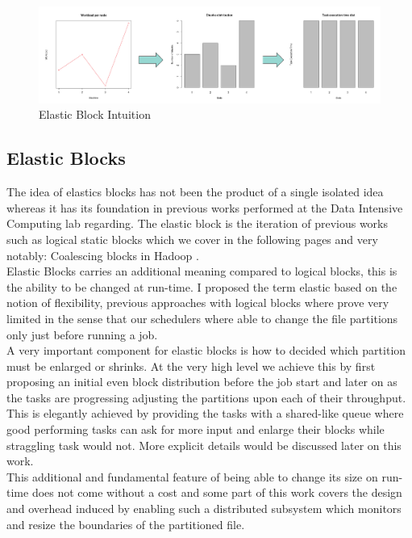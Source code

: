 \label{fig:vdfs_part}
\begin{figure}[H]
    \centering
    \includegraphics[width=1.0\textwidth]{figures/lean_idea.png}
    \caption{Elastic Block Intuition}
\end{figure}

\subsection{Elastic Blocks}

The idea of elastics blocks has not been the product of a single isolated idea
whereas it has its foundation in previous works performed at the Data Intensive
Computing lab regarding. The elastic block is the iteration of previous works
such as logical static blocks which we cover in the following pages and very 
notably: Coalescing blocks in Hadoop \cite{kim2017coalescing}. \\ 

Elastic Blocks carries an additional meaning compared to logical blocks, this is
the ability to be changed at run-time. I proposed the term elastic based on the
notion of flexibility, previous approaches with logical blocks where prove very
limited in the sense that our schedulers where able to change the file partitions 
only just before running a job. \\ 

A very important component for elastic blocks is how to decided which partition must be
enlarged or shrinks. At the very high level we achieve this by first proposing
an initial even block distribution before the job start and later on as the
tasks are progressing adjusting the partitions upon each of their throughput.
This is elegantly achieved by providing the tasks with a shared-like queue where
good performing tasks can ask for more input and enlarge their blocks while
straggling task would not. More explicit details would be discussed later on
this work. \\ 

This additional and fundamental feature of being able to change its size on
run-time does not come without a cost and some part of this work covers the
design and overhead induced by enabling such a distributed subsystem which monitors and
resize the boundaries of the partitioned file.


